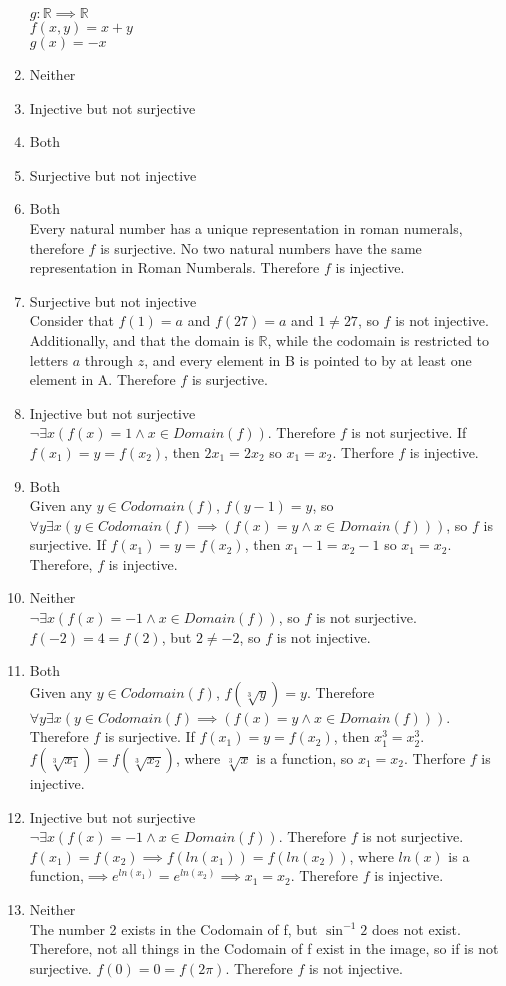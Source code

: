 \documentclass{article}
\begin{document}
\begin{enumerate}
			$g:\mathbb{R} \implies \mathbb{R}$\\
			$f(x,y) = x+y$\\
			$g(x) = -x$\\
		\item
			Neither	
		\item
			Injective but not surjective
		\item
			Both
		\item
			Surjective but not injective
		\item
			Both\\
			Every natural number has a unique representation in roman numerals, therefore $f$ is surjective. No two natural numbers have the same representation in Roman Numberals. Therefore $f$ is injective.
		\item
			Surjective but not injective\\
			Consider that $f(1)=a$ and $f(27)=a$ and $1 \neq 27$, so $f$ is not injective.  Additionally, and that the domain is $\mathbb{R}$, while the codomain is restricted to letters $a$ through $z$, and every element in B is pointed to by at least one element in A. Therefore $f$ is surjective.
		\item
			Injective but not surjective\\
$\neg \exists x (f(x) = 1 \land x \in Domain(f))$. Therefore $f$ is not surjective.
If $f(x_1) = y = f(x_2)$, then $2 x_1 = 2 x_2$ so $x_1 = x_2$. Therfore $f$ is injective.
		\item
			Both\\
Given any $y \in Codomain(f)$, $f(y - 1) = y$, so $\forall y \exists x (y \in Codomain(f) \implies (f(x) = y \land x \in Domain(f)))$, so $f$ is surjective.
If $f(x_1) = y = f(x_2)$, then $x_1 - 1 = x_2 - 1$ so $x_1 = x_2$. Therefore, $f$ is injective.	
		\item
			Neither\\
$\neg \exists x (f(x) = -1 \land x \in Domain(f))$, so $f$ is not surjective.
$f(-2) = 4 = f(2)$, but $2 \neq -2$, so $f$ is not injective.
		\item
			Both\\
Given any $y \in Codomain(f)$, $f(\sqrt[3]{y}) = y$. Therefore $\forall y \exists x (y \in Codomain(f) \implies (f(x) = y \land x \in Domain (f)))$. Therefore $f$ is surjective.
If $f(x_1) = y = f(x_2)$, then $x_1^3 = x_2^3 $. $f(\sqrt[3]{x_1})=f(\sqrt[3]{x_2})$, where $\sqrt[3]{x}$ is a function, so $x_1 = x_2$. Therfore $f$ is injective.
		\item
			Injective but not surjective\\
$\neg \exists x (f(x) = -1 \land x \in Domain(f))$. Therefore $f$ is not surjective.
$f(x_1) = f(x_2) \implies f(ln(x_1)) = f(ln(x_2))$, where $ln(x)$ is a function,$ \implies e^{ln(x_1)} = e^{ln(x_2)} \implies x_1 = x_2$. Therefore $f$ is injective.
		\item
			Neither\\
			The number 2 exists in the Codomain of f, but $\sin^{-1} 2$ does not exist. Therefore, not all things in the Codomain of f exist in the image, so if is not surjective. $ f(0) = 0 = f(2 \pi) $. Therefore $f$ is not injective.


\end{enumerate}
\end{document}
